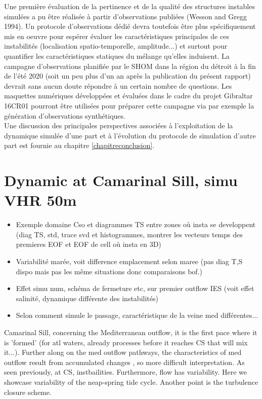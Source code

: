 Une première évaluation de la pertinence et de la qualité des structures instables simulées a pu être réalisée à partir d'observations publiées (Wesson and Gregg 1994). Un protocole d'observations dédié devra toutefois être plus spécifiquement mis en oeuvre pour espérer évaluer les caractéristiques principales de ces instabilités (localisation spatio-temporelle, amplitude...) et surtout pour quantifier les caractéristiques statiques du mélange qu'elles induisent. La campagne d'observations planifiée par le SHOM dans la région du détroit à la fin de l'été 2020 (soit un peu plus d'un an après la publication du présent rapport) devrait sans aucun doute répondre à un certain nombre de questions. Les maquettes numériques développées et évaluées dans le cadre du projet Gibraltar 16CR01 pourront être utilisées pour préparer cette campagne via par exemple la génération d'observations synthétiques.\\
Une discussion des principales perspectives associées à l'exploitation de la dynamique simulée d'une part et à l'évolution du protocole de simulation d'autre part est fournie au chapitre \ref{chapitreconclusion}.



\section{Dynamic at Camarinal Sill, simu VHR 50m}

\begin{itemize}
	\item Exemple domaine Cso et diagrammes TS entre zones où insta se developpent (diag TS, std, trace svd et histogrammes, montrer les vecteurs temps des premieres EOF et EOF de cell où insta en 3D)
	\item Variabilité marée, voit difference emplacement selon maree (pas diag T,S dispo mais pas les même situations donc comparaisons bof.)
	\item Effet simu num, schéma de fermeture etc, sur premier outflow IES (voit effet salinité, dynamique différente des instabilités)
	\item Selon comment simule le passage, caractéristique de la veine med différentes...
\end{itemize}


Camarinal Sill, concerning the Mediterranean outflow, it is the first pace where it is 'formed' (for atl waters, already processes before it reaches CS that will mix it...). Further along on the med outflow pathways, the characteristics of med outflow result from accumulated changes , so more difficult interpretation.  As seen previously, at CS, instbailities. Furthermore, flow has variability. Here we showcase variability of the neap-spring tide cycle. Another point is the turbulence closure scheme.

